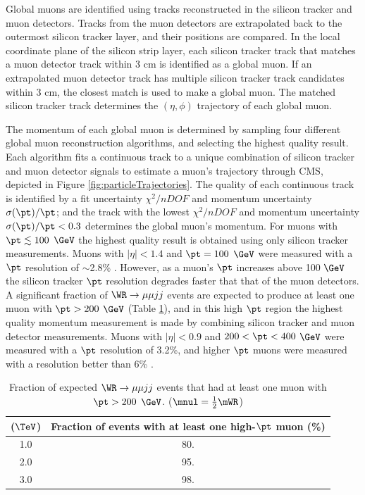 Global muons are identified using tracks reconstructed in the silicon tracker and muon detectors.  Tracks from the muon detectors are 
extrapolated back to the outermost silicon tracker layer, and their positions are compared.  In the local coordinate plane of the 
silicon strip layer, each silicon tracker track that matches a muon detector track within 3 cm is identified as a global muon.  If an 
extrapolated muon detector track has multiple silicon tracker track candidates within 3 cm, the closest match is used to make a global 
muon.  The matched silicon tracker track determines the $(\eta,\phi)$ trajectory of each global muon.

The momentum of each global muon is determined by sampling four different global muon reconstruction algorithms, and selecting the  
highest quality result.  Each algorithm fits a continuous track \cite{cmsMuonRecoRunTwo} to a unique combination of silicon tracker 
and muon detector signals to estimate a muon's trajectory through CMS, depicted in Figure \ref{fig:particleTrajectories}.  The 
quality of each continuous track is identified by a fit uncertainty $\chi^{2}/nDOF$ and momentum uncertainty $\sigma(\pt)/\pt$; and 
the track with the lowest $\chi^{2}/nDOF$ and momentum uncertainty $\sigma(\pt)/\pt < 0.3$ determines the global muon's momentum.  
For muons with $\pt \lesssim 100$ $\GeV$ the highest quality result is obtained using only silicon tracker measurements.  Muons with 
$|\eta| < 1.4$ and $\pt = 100$ $\GeV$ were measured with a $\pt$ resolution of $\sim$2.8\% \cite{trackerPerformanceInCollisions}.  
However, as a muon's $\pt$ increases above 100 $\GeV$ the silicon tracker $\pt$ resolution degrades faster that that of the muon 
detectors.  A significant fraction of $\WR \rightarrow \mu\mu jj$ events are expected to produce at least one muon with $\pt > 200$ $\GeV$ 
(Table \ref{tab:wrHighPtMuons}), and in this high $\pt$ region the highest quality momentum measurement is made by combining silicon 
tracker and muon detector measurements.  Muons with $|\eta| < 0.9$ and $200 < \pt < 400$ $\GeV$ were measured with a $\pt$ resolution 
of 3.2\%, and higher $\pt$ muons were measured with a resolution better than 6\% \cite{cmsMuonRecoRunTwo}.

\begin{table}[h]
	\caption{Fraction of expected $\WR \rightarrow \mu\mu jj$ events that had at least one muon with $\pt > 200$ $\GeV$. 
	($\mnul = \frac{1}{2}\mWR$)}
	\label{tab:wrHighPtMuons}
	\centering
	\begin{tabular}{c|c}
		\mWR ($\TeV$) & Fraction of events with at least one high-$\pt$ muon (\%) \\  \hline
		1.0 &  80.  \\
		2.0 &  95.  \\ 
		3.0 &  98.  \\ \hline
	\end{tabular}
\end{table}

